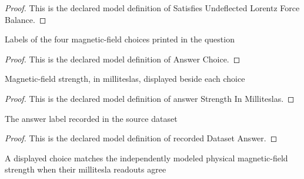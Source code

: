 \begin{proof}
  This is the declared model definition of Satisfies Undeflected Lorentz Force Balance.
\end{proof}
\begin{definition}
  \label{def:physics:phyx-mini-0639:phyxminiproblems-problemphyxmini0639-answerchoice}
  Labels of the four magnetic-field choices printed in the question
\end{definition}
\begin{proof}
  This is the declared model definition of Answer Choice.
\end{proof}
\begin{definition}
  \label{def:physics:phyx-mini-0639:phyxminiproblems-problemphyxmini0639-answerstrengthinmilliteslas}
  Magnetic-field strength, in milliteslas, displayed beside each choice
\end{definition}
\begin{proof}
  This is the declared model definition of answer Strength In Milliteslas.
\end{proof}
\begin{definition}
  \label{def:physics:phyx-mini-0639:phyxminiproblems-problemphyxmini0639-recordeddatasetanswer}
  The answer label recorded in the source dataset
\end{definition}
\begin{proof}
  This is the declared model definition of recorded Dataset Answer.
\end{proof}
\begin{definition}
  \label{def:physics:phyx-mini-0639:phyxminiproblems-problemphyxmini0639-answermatchesmagneticfield}
  A displayed choice matches the independently modeled physical magnetic-field strength when their millitesla readouts agree
\end{definition}
